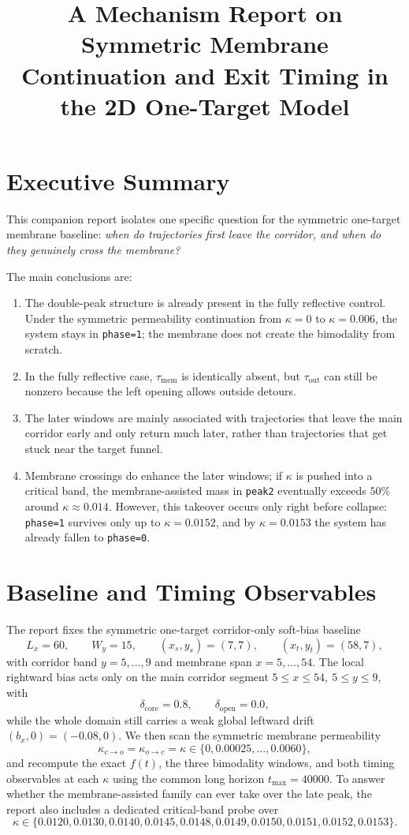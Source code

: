 \documentclass[11pt]{article}
\title{A Mechanism Report on Symmetric Membrane Continuation and Exit Timing in the 2D One-Target Model}
\author{}
\date{}
\begin{document}
\maketitle

\section*{Executive Summary}
This companion report isolates one specific question for the symmetric one-target membrane baseline: \emph{when do trajectories first leave the corridor, and when do they genuinely cross the membrane?}

The main conclusions are:
\begin{enumerate}
  \item The double-peak structure is already present in the fully reflective control. Under the symmetric permeability continuation from \(\kappa=0\) to \(\kappa=0.006\), the system stays in \texttt{phase=1}; the membrane does not create the bimodality from scratch.
  \item In the fully reflective case, \(\tau_{\mathrm{mem}}\) is identically absent, but \(\tau_{\mathrm{out}}\) can still be nonzero because the left opening allows outside detours.
  \item The later windows are mainly associated with trajectories that leave the main corridor early and only return much later, rather than trajectories that get stuck near the target funnel.
  \item Membrane crossings do enhance the later windows; if \(\kappa\) is pushed into a critical band, the membrane-assisted mass in \texttt{peak2} eventually exceeds \(50\%\) around \(\kappa\approx 0.014\). However, this takeover occurs only right before collapse: \texttt{phase=1} survives only up to \(\kappa=0.0152\), and by \(\kappa=0.0153\) the system has already fallen to \texttt{phase=0}.
\end{enumerate}

\section{Baseline and Timing Observables}
The report fixes the symmetric one-target corridor-only soft-bias baseline
\[
L_x=60,\qquad W_y=15,\qquad (x_s,y_s)=(7,7),\qquad (x_t,y_t)=(58,7),
\]
with corridor band \(y=5,\dots,9\) and membrane span \(x=5,\dots,54\). The local rightward bias acts only on the main corridor segment \(5\le x\le 54,\ 5\le y\le 9\), with
\[
\delta_{\mathrm{core}}=0.8,\qquad \delta_{\mathrm{open}}=0.0,
\]
while the whole domain still carries a weak global leftward drift \((b_x,0)=(-0.08,0)\). We then scan the symmetric membrane permeability
\[
\kappa_{c\to o}=\kappa_{o\to c}=\kappa\in\{0,0.00025,\dots,0.0060\},
\]
and recompute the exact \(f(t)\), the three bimodality windows, and both timing observables at each \(\kappa\) using the common long horizon \(t_{\max}=40000\).
To answer whether the membrane-assisted family can ever take over the late peak, the report also includes a dedicated critical-band probe over
\[
\kappa\in\{0.0120,0.0130,0.0140,0.0145,0.0148,0.0149,0.0150,0.0151,0.0152,0.0153\}.
\]
\end{document}
